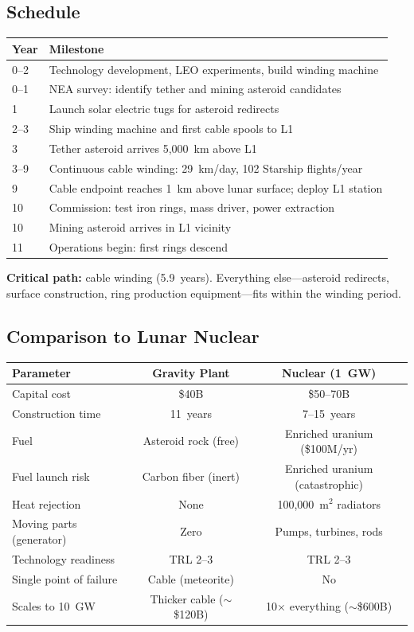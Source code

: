 \documentclass[12pt,letterpaper]{article}
\begin{document}
\subsection{Schedule}

\begin{center}
\small
\begin{tabular}{lp{10cm}}
\toprule
\textbf{Year} & \textbf{Milestone} \\
\midrule
0--2 & Technology development, LEO experiments, build winding machine \\
0--1 & NEA survey: identify tether and mining asteroid candidates \\
1 & Launch solar electric tugs for asteroid redirects \\
2--3 & Ship winding machine and first cable spools to L1 \\
3 & Tether asteroid arrives 5,000~km above L1 \\
3--9 & Continuous cable winding: 29~km/day, 102 Starship flights/year \\
9 & Cable endpoint reaches 1~km above lunar surface; deploy L1 station \\
10 & Commission: test iron rings, mass driver, power extraction \\
10 & Mining asteroid arrives in L1 vicinity \\
11 & Operations begin: first rings descend \\
\bottomrule
\end{tabular}
\end{center}

\textbf{Critical path:} cable winding (5.9~years). Everything else---asteroid redirects, surface construction, ring production equipment---fits within the winding period.

\subsection{Comparison to Lunar Nuclear}

\begin{center}
\small
\begin{tabular}{lcc}
\toprule
\textbf{Parameter} & \textbf{Gravity Plant} & \textbf{Nuclear (1~GW)} \\
\midrule
Capital cost & \$40B & \$50--70B \\
Construction time & 11~years & 7--15~years \\
Fuel & Asteroid rock (free) & Enriched uranium (\$100M/yr) \\
Fuel launch risk & Carbon fiber (inert) & Enriched uranium (catastrophic) \\
Heat rejection & None & 100,000~m$^2$ radiators \\
Moving parts (generator) & Zero & Pumps, turbines, rods \\
Technology readiness & TRL 2--3 & TRL 2--3 \\
Single point of failure & Cable (meteorite) & No \\
Scales to 10~GW & Thicker cable ($\sim$\$120B) & 10$\times$ everything ($\sim$\$600B) \\
\bottomrule
\end{tabular}
\end{center}
\end{document}
